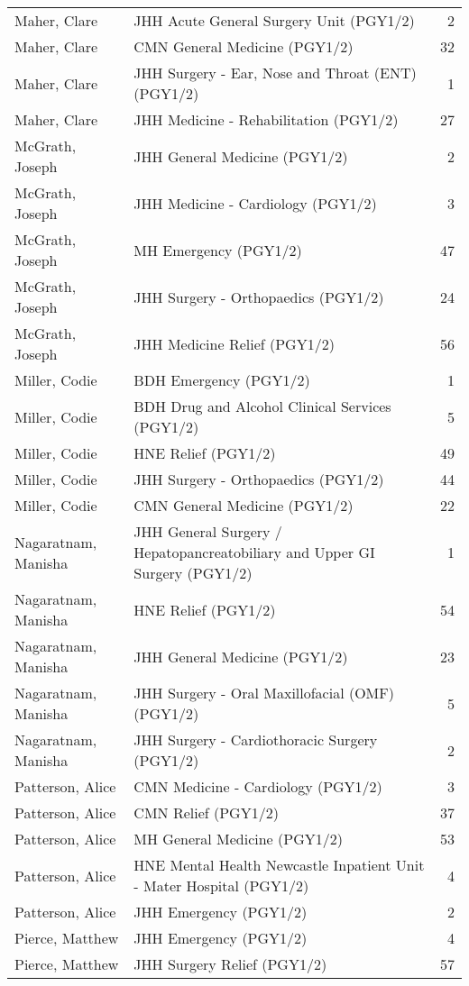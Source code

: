 \documentclass[
]{article}
\begin{document}
\begin{longtable}{llr}
Maher, Clare & JHH Acute General Surgery Unit (PGY1/2) & 2 \\ 
Maher, Clare & CMN General Medicine (PGY1/2) & 32 \\ 
Maher, Clare & JHH Surgery - Ear, Nose and Throat (ENT) (PGY1/2) & 1 \\ 
Maher, Clare & JHH Medicine - Rehabilitation (PGY1/2) & 27 \\ 
McGrath, Joseph & JHH General Medicine (PGY1/2) & 2 \\ 
McGrath, Joseph & JHH Medicine - Cardiology (PGY1/2) & 3 \\ 
McGrath, Joseph & MH Emergency (PGY1/2) & 47 \\ 
McGrath, Joseph & JHH Surgery - Orthopaedics (PGY1/2) & 24 \\ 
McGrath, Joseph & JHH Medicine Relief (PGY1/2) & 56 \\ 
Miller, Codie & BDH Emergency (PGY1/2) & 1 \\ 
Miller, Codie & BDH Drug and Alcohol Clinical Services (PGY1/2) & 5 \\ 
Miller, Codie & HNE Relief (PGY1/2) & 49 \\ 
Miller, Codie & JHH Surgery - Orthopaedics (PGY1/2) & 44 \\ 
Miller, Codie & CMN General Medicine (PGY1/2) & 22 \\ 
Nagaratnam, Manisha & JHH General Surgery / Hepatopancreatobiliary and Upper GI Surgery (PGY1/2) & 1 \\ 
Nagaratnam, Manisha & HNE Relief (PGY1/2) & 54 \\ 
Nagaratnam, Manisha & JHH General Medicine (PGY1/2) & 23 \\ 
Nagaratnam, Manisha & JHH Surgery - Oral Maxillofacial (OMF) (PGY1/2) & 5 \\ 
Nagaratnam, Manisha & JHH Surgery - Cardiothoracic Surgery (PGY1/2) & 2 \\ 
Patterson, Alice & CMN Medicine - Cardiology (PGY1/2) & 3 \\ 
Patterson, Alice & CMN Relief (PGY1/2) & 37 \\ 
Patterson, Alice & MH General Medicine (PGY1/2) & 53 \\ 
Patterson, Alice & HNE Mental Health Newcastle Inpatient Unit - Mater Hospital (PGY1/2) & 4 \\ 
Patterson, Alice & JHH Emergency (PGY1/2) & 2 \\ 
Pierce, Matthew & JHH Emergency (PGY1/2) & 4 \\ 
Pierce, Matthew & JHH Surgery Relief (PGY1/2) & 57 \\ 

\end{longtable}
\end{document}
